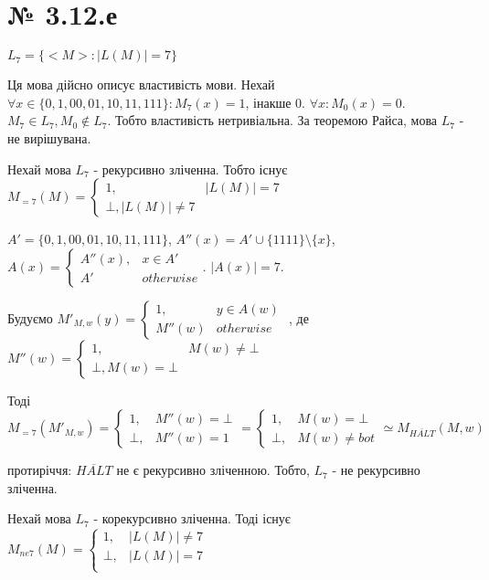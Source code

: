 \documentclass[11pt, a4paper]{article} %
\begin{document}
\section*{№ 3.12.е}
\begin{mdframed}
    $L_{7} = \{<M> : |L(M)| = 7\}$
\end{mdframed}

Ця мова дійсно описує властивість мови.
Нехай $\forall x \in \{0,1,00,01,10,11,111\}: M_{7}(x) = 1$, інакше 0.
$\forall x: M_0(x) = 0$. $M_7 \in L_{7}, M_0 \notin L_{7}$. 
Тобто властивість нетривіальна. 
За теоремою Райса, мова $L_{7}$ - не вирішувана.

Нехай мова $L_7$ - рекурсивно зліченна.
Тобто існує $M_{=7}(M) = \begin{cases}
    1, & |L(M)| = 7\\
    \bot, |L(M)| \ne 7
\end{cases}$

$A' = \{0,1,00,01,10,11,111\}$,
$A''(x) = A' \cup \{1111\} \setminus \{x\}$,
$A(x) = \begin{cases}
    A''(x), & x \in A'\\
    A' & otherwise
\end{cases}$. $|A(x)| = 7$.


Будуємо $M'_{M,w}(y) = \begin{cases}
    1, & y \in A(w) \\
    M''(w) & otherwise
\end{cases}$
, де $M''(w) = \begin{cases}
    1, & M(w) \ne \bot\\
    \bot, M(w) = \bot
\end{cases}$

Тоді 
$$M_{=7}(M'_{M,w}) = \begin{cases}
    1, & M''(w) = \bot\\
    \bot, & M''(w) = 1
\end{cases} = \begin{cases}
    1, & M(w) = \bot\\
    \bot, & M(w) \ne bot
\end{cases} \simeq M_{\overline{HALT}}(M,w)$$

протиріччя: $\overline{HALT}$ не є рекурсивно зліченною.
Тобто, $L_7$ - не рекурсивно зліченна.

Нехай мова $L_7$ - корекурсивно зліченна.
Тоді існує $M_{ne7}(M) = \begin{cases}
    1, & |L(M)| \ne 7 \\
    \bot, & |L(M)| = 7 \\
\end{cases}$
\end{document}
